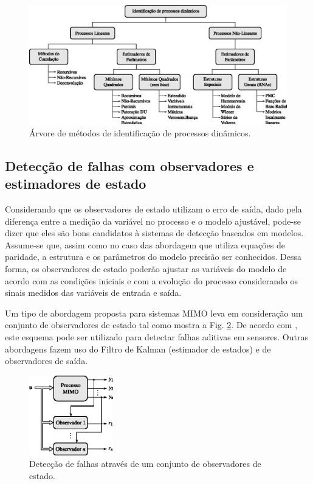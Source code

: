 \begin{figure}[htb]
\centering
    \includegraphics[width=\textwidth]{imgs/detec_diag/eps/metodos_identificacao}
    \caption{Árvore de métodos de identificação de processos dinâmicos.}
    \label{fig:metodos_identificacao}
\end{figure}

\subsection{Detecção de falhas com observadores e estimadores de estado}
Considerando que os observadores de estado utilizam o erro de saída, dado pela
diferença entre a medição da variável no processo e o modelo ajustável, pode-se
dizer que eles são bons candidatos à sistemas de detecção baseados em modelos.
Assume-se que, assim como no caso das abordagem que utiliza equações de
paridade, a estrutura e os parâmetros do modelo precisão ser conhecidos. Dessa
forma, os observadores de estado poderão ajustar as variáveis do modelo de
acordo com as condições iniciais e com a evolução do processo considerando os
sinais medidos das variáveis de entrada e saída.

Um tipo de abordagem proposta para sistemas MIMO leva em consideração um
conjunto de observadores de estado tal como mostra a Fig.
\ref{fig:conj_obs_est}. De acordo com , este esquema
pode ser utilizado para detectar falhas aditivas em sensores. Outras abordagens
fazem uso do Filtro de Kalman (estimador de estados) e de observadores de saída. 

\begin{figure}[htb]
\centering
    \includegraphics[width=0.325\textwidth]{imgs/detec_diag/eps/conj_obs_est}
    \caption{Detecção de falhas através de um conjunto de observadores de
             estado.}
    \label{fig:conj_obs_est}
\end{figure}
 
